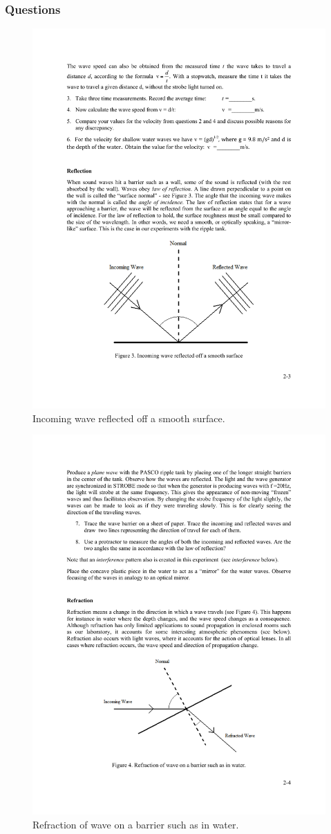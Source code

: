 \documentclass[11pt]{NSF}
\begin{document}
\subsubsection*{Questions}

%
\begin{figure}[hbtp]
\begin{center}
\includegraphics[width=.6\textwidth]{fig2_3}
\caption{Incoming wave reflected off a smooth surface.}
\label{f:3}
\end{center}
\end{figure}
%

%
\begin{figure}[hbtp]
\begin{center}
\includegraphics[width=.6\textwidth]{fig2_4}
\caption{Refraction of wave on a barrier such as in water.}
\label{f:4}
\end{center}
\end{figure}
%
\end{document}
